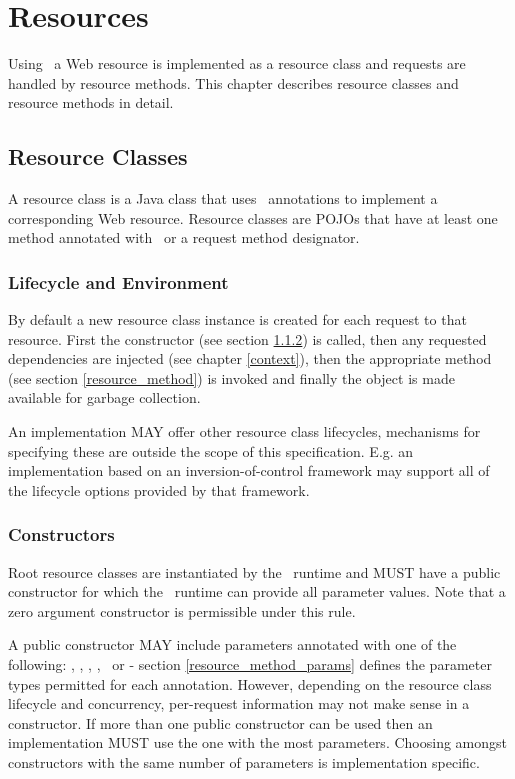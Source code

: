 \chapter{Resources}
\label{resources}

Using \jaxrs\, a Web resource is implemented as a resource class and requests are handled by resource methods. This chapter describes resource classes and resource methods in detail.

\section{Resource Classes}

A resource class is a Java class that uses \jaxrs\ annotations to implement a corresponding Web resource. Resource classes are POJOs that have at least one method annotated with \Path\ or a request method designator.

\subsection{Lifecycle and Environment}

By default a new resource class instance is created for each request to that resource. First the constructor (see section \ref{resource_class_constructor}) is called, then any requested dependencies are injected (see chapter \ref{context}), then the appropriate method (see section \ref{resource_method}) is invoked and finally the object is made available for garbage collection.

An implementation MAY offer other resource class lifecycles, mechanisms for specifying these are outside the scope of this specification. E.g. an implementation based on an inversion-of-control framework may support all of the lifecycle options provided by that framework.

\subsection{Constructors}
\label{resource_class_constructor}

Root resource classes are instantiated by the \jaxrs\ runtime and MUST have a public constructor for which the \jaxrs\ runtime can provide all parameter values. Note that a zero argument constructor is permissible under this rule.

A public constructor MAY include parameters annotated with one of the following: \Context, \HeaderParam, \CookieParam, \MatrixParam, \QueryParam\ or \PathParam - section \ref{resource_method_params} defines the parameter types permitted for each annotation. However, depending on the resource class lifecycle and concurrency, per-request information may not make sense in a constructor. If more than one public constructor can be used then an implementation MUST use the one with the most parameters. Choosing amongst constructors with the same number of parameters is implementation specific.

